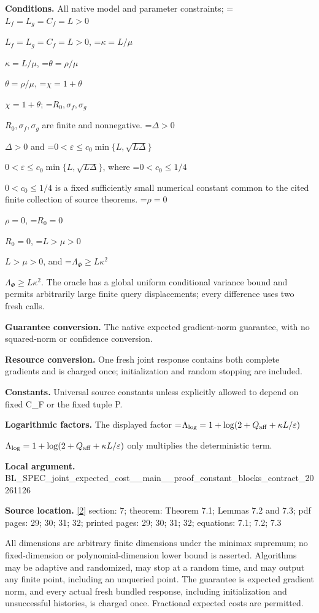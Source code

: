 \documentclass[10pt,a4paper]{article}
\newcommand{\AtlasMath}[1]{\par\begingroup\centering\setbox0=\hbox{$\displaystyle #1$}\ifdim\wd0>1.4\linewidth\typeout{ATLAS WIDE FORMULA: \the\wd0}\fi\ifdim\wd0>\linewidth\resizebox{\linewidth}{!}{\box0}\else\box0\fi\par\endgroup}
\newcommand{\AtlasInlineMath}[1]{\begingroup\setbox0=\hbox{$#1$}\ifdim\wd0>.4\linewidth\endgroup\AtlasMath{#1}\else\endgroup$#1$\fi}
\begin{document}
\textbf{Conditions.} All native model and parameter constraints; \AtlasInlineMath{L_f=L_g=C_f=L>0}, \AtlasInlineMath{\kappa=L/\mu}, \AtlasInlineMath{\theta=\rho/\mu}, \AtlasInlineMath{\chi=1+\theta}; \AtlasInlineMath{R_0,\sigma_f,\sigma_g} are finite and nonnegative. \AtlasInlineMath{\Delta>0} and \AtlasInlineMath{0<\varepsilon\le c_0\min\{L,\sqrt{L\Delta}\}}, where \AtlasInlineMath{0<c_0\le1/4} is a fixed sufficiently small numerical constant common to the cited finite collection of source theorems. \AtlasInlineMath{\rho=0}, \AtlasInlineMath{R_0=0}, \AtlasInlineMath{L>\mu>0}, and \AtlasInlineMath{\Lambda_\Phi\ge L\kappa^2}. The oracle has a global uniform conditional variance bound and permits arbitrarily large finite query displacements; every difference uses two fresh calls.



\textbf{Guarantee conversion.} The native expected gradient-norm guarantee, with no squared-norm or confidence conversion.



\textbf{Resource conversion.} One fresh joint response contains both complete gradients and is charged once; initialization and random stopping are included.



\textbf{Constants.} Universal source constants unless explicitly allowed to depend on fixed C\_F or the fixed tuple P.



\textbf{Logarithmic factors.} The displayed factor \AtlasInlineMath{\Lambda_{\log}=1+\log(2+Q_{\rm aff}+\kappa L/\varepsilon)} only multiplies the deterministic term.



\textbf{Local argument.} BL\_SPEC\_joint\_expected\_c\allowbreak{}ost\_\_main\_\_proof\_constan\allowbreak{}t\_blocks\_contract\_202611\allowbreak{}26



\textbf{Source location.} \href{https://github.com/WU-Wendao/Colombo/blob/main/colombo_sensorium/Complexity_altas/data/sources/colombo/SFO_JOINT_20261126/manuscript.pdf}{[2]} section: 7; theorem: Theorem 7.1; Lemmas 7.2 and 7.3; pdf pages: 29; 30; 31; 32; printed pages: 29; 30; 31; 32; equations: 7.1; 7.2; 7.3



All dimensions are arbitrary finite dimensions under the minimax supremum; no fixed-dimension or polynomial-dimension lower bound is asserted. Algorithms may be adaptive and randomized, may stop at a random time, and may output any finite point, including an unqueried point. The guarantee is expected gradient norm, and every actual fresh bundled response, including initialization and unsuccessful histories, is charged once. Fractional expected costs are permitted.
\end{document}
